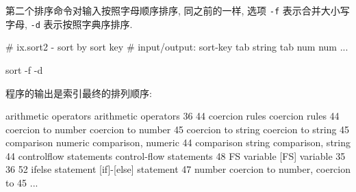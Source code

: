 第二个排序命令对输入按照字母顺序排序, 同之前的一样, 选项 \texttt{-f}
表示合并大小写字母, \texttt{-d} 表示按照字典序排序.
\begin{awkcode}
    # ix.sort2 - sort by sort key
    #     input/output: sort-key tab string tab num num ...

    sort -f -d
\end{awkcode}
程序的输出是索引最终的排列顺序:
\begin{file}
    arithmetic operators        arithmetic operators    36 44
    coercion rules      coercion rules  44
    coercion to number  coercion to number      45
    coercion to string  coercion to string      45
    comparison numeric  comparison, numeric     44
    comparison string   comparison, string      44
    controlflow statements      control-flow statements 48
    FS variable [FS] variable   35 36 52
    ifelse statement    [if]-[else] statement   47
    number coercion to  number, coercion to     45
    ...
\end{file}

